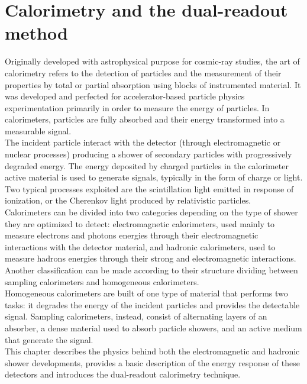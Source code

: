 \chapter[Calorimetry and the DR method]{Calorimetry and the dual-readout method}
Originally developed with astrophysical purpose for cosmic-ray studies, the art of calorimetry refers to the detection of particles and the measurement of their properties by total or partial absorption using blocks of instrumented material.
It was developed and perfected for accelerator-based particle physics experimentation primarily in order to measure the energy of particles. 
In calorimeters, particles are fully absorbed and their energy transformed into a measurable signal.\\
The incident particle interact with the detector (through electromagnetic or nuclear processes) producing a shower of secondary particles with progressively degraded energy.
The energy deposited by charged particles in the calorimeter active material is used to generate signals, typically in the form of charge or light.
Two typical processes exploited are the scintillation light emitted in response of ionization, or the Cherenkov light produced by relativistic particles.\\

Calorimeters can be divided into two categories depending on the type of shower they are optimized to detect: electromagnetic calorimeters, used mainly to measure electrons and photons energies through their electromagnetic interactions with the detector material, and hadronic calorimeters, used to measure hadrons energies through their strong and electromagnetic interactions.
Another classification can be made according to their structure dividing between sampling calorimeters and homogeneous calorimeters.\\
Homogeneous calorimeters are built of one type of material that performs two tasks: it degrades the energy of the incident particles and provides the detectable signal.
Sampling calorimeters, instead, consist of alternating layers of an absorber, a dense material used to absorb particle showers, and an active medium that generate the signal.\\

This chapter describes the physics behind both the electromagnetic and hadronic shower developments, provides a basic description of the energy response of these detectors and introduces the dual-readout calorimetry technique.\\

